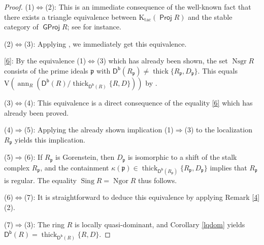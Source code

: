 \documentclass{amsart}
\theoremstyle{definition}
\theoremstyle{remark}
\numberwithin{equation}{thm}
\def\ann{\operatorname{ann}}
\def\Db{\operatorname{\mathsf{D^b}}}
\def\GProj{\operatorname{\mathsf{GProj}}}
\def\id{\operatorname{id}}
\def\Im{\operatorname{Im}}
\def\Ktac{\mathrm{K}_{\operatorname{tac}}}
\def\ng{\operatorname{Ngor}}
\def\nsgr{\operatorname{Nsgr}}
\def\Proj{\operatorname{\mathsf{Proj}}}
\def\p{\mathfrak{p}}
\def\sing{\operatorname{Sing}}
\def\thick{\operatorname{thick}}
\def\V{\mathrm{V}}
\begin{document}
\begin{proof}
(1)$\Leftrightarrow$(2):
This is an immediate consequence of the well-known fact that  there exists a triangle equivalence between $\Ktac (\Proj R)$ and the stable category of $\GProj R$; see \cite[Example 3.10]{CET20} for instance.

(2)$\Leftrightarrow$(3):
Applying \cite[(1) and (2) of Theorem 5.3]{IK06}, we immediately get this equivalence.

\eqref{6}:
By the equivalence (1)$\Leftrightarrow$(3) which has already been shown, the set $\nsgr R$ consists of the prime ideals $\p$ with $\Db(R_\p) \ne \thick\{R_\p, D_\p\}$.
This equals $\V(\ann_R (\Db(R)/\thick_{\Db(R)}\{R, D\}))$ by \cite[Corollary 3.3]{DM24}.

(3)$\Leftrightarrow$(4):
This equivalence is a direct consequence of the equality \eqref{6} which has already been proved.

(4)$\Rightarrow$(5):
Applying the already shown implication (1)$\Rightarrow$(3) to the localization $R_\p$ yields this implication.

(5)$\Rightarrow$(6):
If $R_\p$ is Gorenstein, then $D_\p$ is isomorphic to a shift of the stalk complex $R_\p$, and the containment $\kappa(\p)\in\thick_{\Db(R_\p)}\{R_\p,D_\p\}$ implies that $R_\p$ is regular.
The equality $\sing R=\ng R$ thus follows.

(6)$\Leftrightarrow$(7):
It is straightforward to deduce this equivalence by applying Remark \ref{4}(2). 

(7)$\Rightarrow$(3):
The ring $R$ is locally quasi-dominant, and Corollary \ref{lqdom} yields $\Db(R)=\thick_{\Db(R)}\{R, D\}$.
\end{proof}
\end{document}
